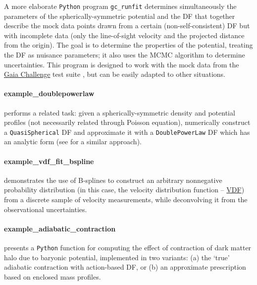 \documentclass[12pt]{article}
\newcommand{\Python}{\texttt{Python}\xspace}
\newcommand{\ppp}[1]{\textcolor{darkolive} {\texttt{#1}}}
\let\oldparagraph\paragraph
\renewcommand{\paragraph}[1]{\vspace{-2mm}\oldparagraph{#1}}
\begin{document}
A more elaborate \Python program \texttt{gc_runfit} determines simultaneously the parameters of the spherically-symmetric potential and the DF that together describe the mock data points drawn from a certain (non-self-consistent) DF but with incomplete data (only the line-of-sight velocity and the projected distance from the origin). The goal is to determine the properties of the potential, treating the DF as nuisance parameters; it also uses the MCMC algorithm to determine uncertainties. 
This program is designed to work with the mock data from the \href{http://astrowiki.ph.surrey.ac.uk/dokuwiki/doku.php?id=tests:sphtri:spherical}{Gaia Challenge} test suite \cite{Read2021}, but can be easily adapted to other situations.

\paragraph{example_doublepowerlaw} performs a related task: given a spherically-symmetric density and potential profiles (not necessarily related through Poisson equation), numerically construct a \ppp{QuasiSpherical} DF and approximate it with a \ppp{DoublePowerLaw} DF which has an analytic form (see \cite{Jeffreson2017} for a similar approach).

\paragraph{example_vdf_fit_bspline} demonstrates the use of B-splines to construct an arbitrary nonnegative probability distribution (in this case, the velocity distribution function -- \hyperref[sec:VDF]{VDF}) from a discrete sample of velocity measurements, while deconvolving it from the observational uncertainties.

\paragraph{example_adiabatic_contraction} presents a \Python function for computing the effect of contraction of dark matter halo due to baryonic potential, implemented in two variants: (a) the `true' adiabatic contraction with action-based DF, or (b) an approximate prescription based on enclosed mass profiles.
\end{document}
